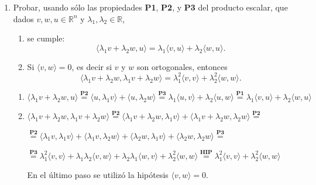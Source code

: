 \begin{enumerate}[topsep=6pt, itemsep=.4cm]
\item Probar, usando sólo las propiedades \textbf{P1}, \textbf{P2}, y \textbf{P3} del producto escalar, que dados $v, w, u \in \mathbb R^n$ y $\lambda_1, \lambda_2 \in \mathbb R$, 
\begin{enumerate}
	\item se cumple:
	\begin{equation*}
	\langle \lambda_1 v + \lambda_2 w , u  \rangle =  \lambda_1\langle v , u  \rangle +   \lambda_2\langle w , u  \rangle.
	\end{equation*}
	\item Si $\langle v , w  \rangle =0$, es decir si $v$ y $w$ son ortogonales,  entonces
	\begin{equation*}
		\langle \lambda_1 v + \lambda_2 w ,  \lambda_1 v + \lambda_2 w   \rangle =
		\lambda_1^2 \langle  v ,  v  \rangle + \lambda_2^2 \langle w,w  \rangle.
	\end{equation*}
\end{enumerate}

\rta 

\begin{enumerate}
\item $\langle \lambda_1 v + \lambda_2 w , u  \rangle \overset{\textbf{P2}}{=} \langle u , \lambda_1 v \rangle + \langle u , \lambda_2 w \rangle \overset{\textbf{P3}}{=} \lambda_1 \langle u,v \rangle + \lambda_2 \langle u,w \rangle \overset{\textbf{P1}}{=} \lambda_1 \langle v,u \rangle + \lambda_2 \langle w,u \rangle$

\item $ \langle \lambda_1 v + \lambda_2 w, \lambda_1 v + \lambda_2 w \rangle \overset{\textbf{P2}}{=} \langle \lambda_1 v + \lambda_2 w, \lambda_1 v \rangle + \langle \lambda_1 v + \lambda_2 w, \lambda_2 w \rangle \overset{\textbf{P2}}{=} $

$ \overset{\textbf{P2}}{=} \langle \lambda_1 v , \lambda_1 v \rangle + \langle \lambda_1 v, \lambda_2 w \rangle + \langle \lambda_2 w, \lambda_1 v \rangle + \langle \lambda_2 w, \lambda_2 w \rangle \overset{\textbf{P3}}{=} $

$ \overset{\textbf{P3}}{=} \lambda_1^2 \langle v , v \rangle + \lambda_1 \lambda_2 \langle v, w \rangle + \lambda_2 \lambda_1 \langle w, v \rangle + \lambda_2^2 \langle w, w \rangle \overset{\textbf{HIP}}{=} \lambda_1^2 \langle v , v \rangle + \lambda_2^2 \langle w, w \rangle $

En el último paso se utilizó la hipótesis $\langle v , w  \rangle =0$.

\end{enumerate}


\end{enumerate}

